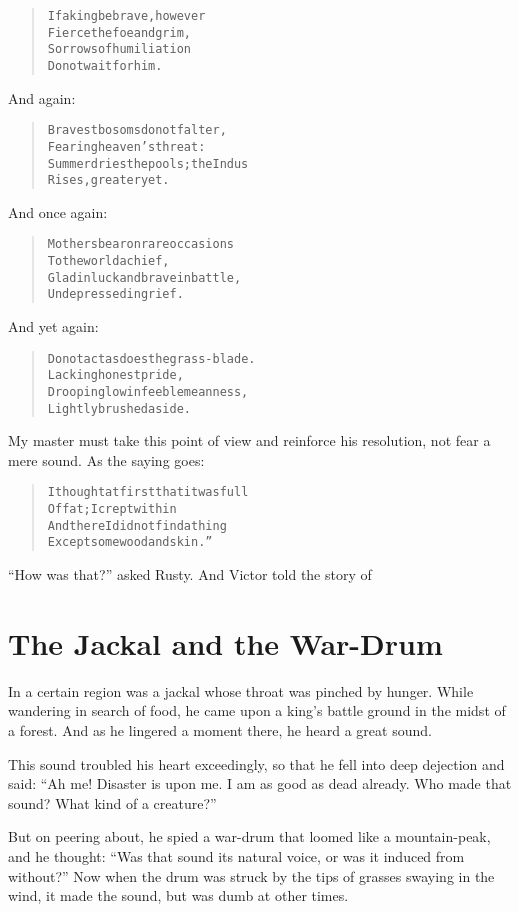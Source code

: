 \documentclass[article, twoside, 14pt]{memoir}
\renewenvironment{verbatim}{%
\begin{quote}%
\vskip -10pt%
\begin{alltt}\normalfont\large}{\end{alltt}%
\end{quote}%
\vskip -10pt
} %
\begin{document}
\begin{verbatim}
If a king be brave, however
    Fierce the foe and grim,
Sorrows of humiliation
    Do not wait for him.
\end{verbatim}
And again:

\begin{verbatim}
Bravest bosoms do not falter,
    Fearing heaven's threat:
Summer dries the pools; the Indus
    Rises, greater yet.
\end{verbatim}
And once again:

\begin{verbatim}
Mothers bear on rare occasions
    To the world a chief,
Glad in luck and brave in battle,
    Undepressed in grief.
\end{verbatim}
And yet again:

\begin{verbatim}
Do not act as does the grass-blade.
    Lacking honest pride,
Drooping low in feeble meanness,
    Lightly brushed aside.
\end{verbatim}
My master must take this point of view and reinforce his
resolution, not fear a mere sound. As the saying goes:

\begin{verbatim}
I thought at first that it was full
    Of fat; I crept within
And there I did not find a thing
    Except some wood and skin.”
\end{verbatim}
``How was that?'' asked Rusty. And Victor told the story of

\chapter{The Jackal and the War-Drum}

\label{s3}

In a certain region was a jackal whose throat was pinched by
hunger. While wandering in search of food, he came upon a king's
battle ground in the midst of a forest. And as he lingered a moment
there, he heard a great sound.

This sound troubled his heart exceedingly, so that he fell into
deep dejection and said:
``Ah me! Disaster is upon me. I am as good as dead already. Who made that sound? What kind of a creature?''

But on peering about, he spied a war-drum that loomed like a
mountain-peak, and he thought:
``Was that sound its natural voice, or was it induced from without?''
Now when the drum was struck by the tips of grasses swaying in the
wind, it made the sound, but was dumb at other times.
\end{document}
